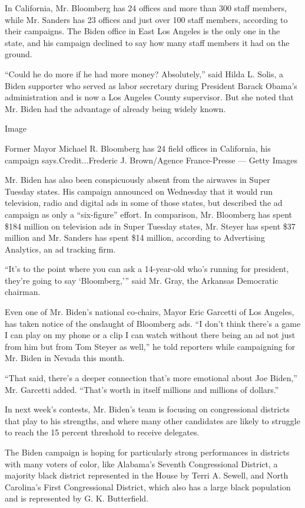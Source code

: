 In California, Mr. Bloomberg has 24 offices and more than 300 staff
members, while Mr. Sanders has 23 offices and just over 100 staff
members, according to their campaigns. The Biden office in East Los
Angeles is the only one in the state, and his campaign declined to say
how many staff members it had on the ground.

``Could he do more if he had more money? Absolutely,'' said Hilda L.
Solis, a Biden supporter who served as labor secretary during President
Barack Obama's administration and is now a Los Angeles County
supervisor. But she noted that Mr. Biden had the advantage of already
being widely known.

Image

Former Mayor Michael R. Bloomberg has 24 field offices in California,
his campaign says.Credit...Frederic J. Brown/Agence France-Presse ---
Getty Images

Mr. Biden has also been conspicuously absent from the airwaves in Super
Tuesday states. His campaign announced on Wednesday that it would run
television, radio and digital ads in some of those states, but described
the ad campaign as only a ``six-figure'' effort. In comparison, Mr.
Bloomberg has spent \$184 million on television ads in Super Tuesday
states, Mr. Steyer has spent \$37 million and Mr. Sanders has spent \$14
million, according to Advertising Analytics, an ad tracking firm.

``It's to the point where you can ask a 14-year-old who's running for
president, they're going to say `Bloomberg,''' said Mr. Gray, the
Arkansas Democratic chairman.

Even one of Mr. Biden's national co-chairs, Mayor Eric Garcetti of Los
Angeles, has taken notice of the onslaught of Bloomberg ads. ``I don't
think there's a game I can play on my phone or a clip I can watch
without there being an ad not just from him but from Tom Steyer as
well,'' he told reporters while campaigning for Mr. Biden in Nevada this
month.

``That said, there's a deeper connection that's more emotional about Joe
Biden,'' Mr. Garcetti added. ``That's worth in itself millions and
millions of dollars.''

In next week's contests, Mr. Biden's team is focusing on congressional
districts that play to his strengths, and where many other candidates
are likely to struggle to reach the 15 percent threshold to receive
delegates.

The Biden campaign is hoping for particularly strong performances in
districts with many voters of color, like Alabama's Seventh
Congressional District, a majority black district represented in the
House by Terri A. Sewell, and North Carolina's First Congressional
District, which also has a large black population and is represented by
G. K. Butterfield.

